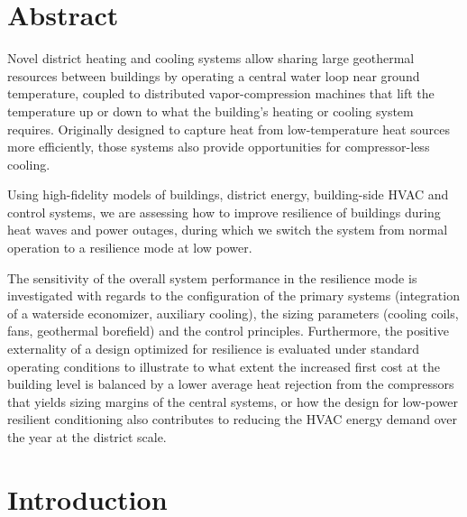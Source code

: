 \section{Abstract} \label{sec:abstract}

Novel district heating and cooling systems allow sharing large geothermal resources between buildings by operating a central water loop near ground temperature, coupled to distributed vapor-compression machines that lift the temperature up or down to what the building’s heating or cooling system requires.
Originally designed to capture heat from low-temperature heat sources more efficiently, those systems also provide opportunities for compressor-less cooling.

Using high-fidelity models of buildings, district energy, building-side HVAC and control systems, we are assessing how to improve resilience of buildings during heat waves and power outages, during which we switch the system from normal operation to a resilience mode at low power.

The sensitivity of the overall system performance in the resilience mode is investigated with regards to the configuration of the primary systems (integration of a waterside economizer, auxiliary cooling), the sizing parameters (cooling coils, fans, geothermal borefield) and the control principles.
Furthermore, the positive externality of a design optimized for resilience is evaluated under standard operating conditions to illustrate to what extent the increased first cost at the building level is balanced by a lower average heat rejection from the compressors that yields sizing margins of the central systems, or how the design for low-power resilient conditioning also contributes to reducing the HVAC energy demand over the year at the district scale.



\section{Introduction} \label{sec:introduction}

